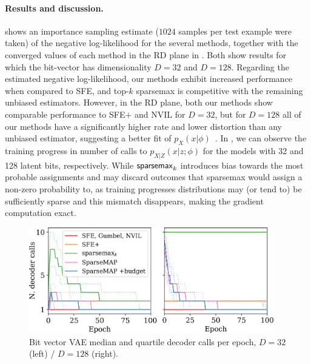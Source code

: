 \paragraph*{Results and discussion.} 
shows an importance sampling estimate ($1024$ samples per test
example were taken) of the negative log-likelihood for the several
methods, together with the converged values of each method in the RD
plane in . Both show results for which the
bit-vector has dimensionality $D=32$ and $D=128$. Regarding the
estimated negative log-likelihood, our methods exhibit increased
performance when compared to SFE, and top-$k$ sparsemax is
competitive with the remaining unbiased estimators. However, in the
RD plane, both our methods show comparable performance to SFE$+$ and
NVIL for $D=32$, but for $D=128$ all of our methods have a
significantly higher rate and lower distortion than any unbiased
estimator, suggesting a better fit of $p_X(x|\phi)$~\citep{Alemi2018}.
In , we can observe the training progress in
number of calls to $p_{X|Z}(x |z; \phi)$ for the models with 32 and 128
latent bits, respectively. While $\operatorname{\mathsf{sparsemax}_\text{$k$}}$ introduces bias
towards the most probable assignments and may discard outcomes that
sparsemax would assign a non-zero probability to, as training
progresses distributions may (or tend to) be sufficiently sparse and
this mismatch disappears, making the gradient computation exact.

\begin{figure}[htbp]
    \centering
    \includegraphics[width=0.95\textwidth]{Figures/spars.pdf}
    \caption[Bit vector VAE median and quartile decoder calls per
        epoch.]{Bit vector VAE median and quartile decoder calls per
        epoch,
        $D=32$ (left) / $D=128$ (right).\label{fig:structcalls}}
\end{figure}


